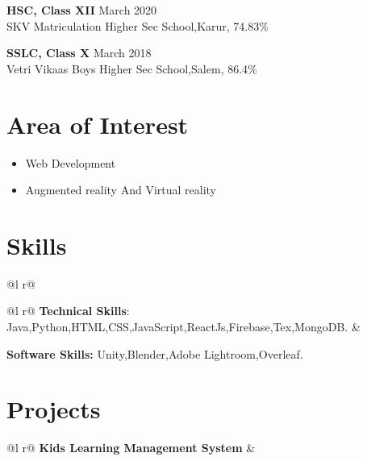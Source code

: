 \documentclass[a4paper,12pt]{article}
\begin{document}
{\textbf{HSC, Class XII}}  \hfill March 2020 \\
SKV Matriculation Higher Sec School,Karur, 74.83\% 

{\textbf{SSLC, Class X}}  \hfill March  2018\\
Vetri Vikaas Boys Higher Sec School,Salem, 86.4\% 

\section{Area of Interest}
\begin{itemize}
    \item Web Development
    \item Augmented reality And Virtual reality
\end{itemize}



\section{Skills}
\begin{tabularx}{\linewidth}{ @{}l r@{} }
{
\begin{tabularx}{\linewidth}{ @{}l r@{} }
{\textbf{Technical Skills}: Java,Python,HTML,CSS,JavaScript,ReactJs,Firebase,Tex,MongoDB.} & \hfill \\[3.75pt]
\end{tabularx}

\item{\textbf{Software Skills: }Unity,Blender,Adobe Lightroom,Overleaf.} 
}
\end{tabularx}

\section{Projects}

\begin{tabularx}{\linewidth}{ @{}l r@{} }
\textbf{Kids Learning Management System} & \hfill \\[3.75pt]
\end{tabularx}
\end{document}
